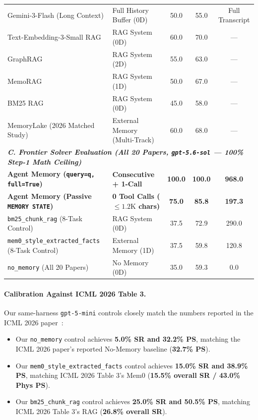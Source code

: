 \documentclass[11pt,a4paper]{article}
\begin{document}
\begin{table}[t]
{\begin{tabular}{llccc}
Gemini-3-Flash (Long Context) & Full History Buffer (0D) & 50.0 & 55.0 & Full Transcript \\
Text-Embedding-3-Small RAG & RAG System (0D) & 60.0 & 70.0 & --- \\
GraphRAG & RAG System (2D) & 55.0 & 63.0 & --- \\
MemoRAG & RAG System (1D) & 50.0 & 67.0 & --- \\
BM25 RAG & RAG System (0D) & 45.0 & 58.0 & --- \\
MemoryLake (2026 Matched Study) & External Memory (Multi-Track) & 60.0 & 68.0 & --- \\
\midrule
\multicolumn{5}{l}{\emph{\textbf{C. Frontier Solver Evaluation (All 20 Papers, \texttt{gpt-5.6-sol} --- 100\% Step-1 Math Ceiling)}}} \\
\textbf{Agent Memory (\texttt{query=q, full=True})} & \textbf{Consecutive + 1-Call} & \textbf{100.0} & \textbf{100.0} & \textbf{968.0} \\
\textbf{Agent Memory (Passive \texttt{MEMORY STATE})} & \textbf{0 Tool Calls ($\le 1.2\text{K}$ chars)} & \textbf{75.0} & \textbf{85.8} & \textbf{197.3} \\
\texttt{bm25\_chunk\_rag} (8-Task Control) & RAG System (0D) & 37.5 & 72.9 & 290.0 \\
\texttt{mem0\_style\_extracted\_facts} (8-Task Control) & External Memory (1D) & 37.5 & 59.8 & 120.8 \\
\texttt{no\_memory} (All 20 Papers) & No Memory (0D) & 35.0 & 59.3 & 0.0 \\
\bottomrule
\end{tabular}%
}
\end{table}

\paragraph{Calibration Against ICML 2026 Table 3.}
Our same-harness \texttt{gpt-5-mini} controls closely match the numbers reported in the ICML 2026 paper~\cite{he2026memoryarena}:
\begin{itemize}[leftmargin=1.5em,itemsep=1pt]
    \item Our \texttt{no\_memory} control achieves \textbf{5.0\% SR and 32.2\% PS}, matching the ICML 2026 paper's reported No-Memory baseline (\textbf{32.7\% PS}).
    \item Our \texttt{mem0\_style\_extracted\_facts} control achieves \textbf{15.0\% SR and 38.9\% PS}, matching ICML 2026 Table 3's Mem0 (\textbf{15.5\% overall SR / 43.0\% Phys PS}).
    \item Our \texttt{bm25\_chunk\_rag} control achieves \textbf{25.0\% SR and 50.5\% PS}, matching ICML 2026 Table 3's RAG (\textbf{26.8\% overall SR}).
\end{itemize}
\end{document}
